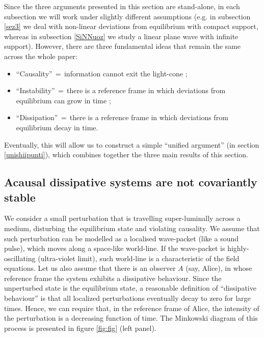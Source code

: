 \documentclass[a4paper, amsfonts, amssymb, amsmath, reprint, showkeys,  twoside, onecolumn,notitlepage,nofootinbib]{revtex4-1}
\theoremstyle{definition}
\theoremstyle{theorem}
\begin{document}
Since the three arguments presented in this section are stand-alone, in each subsection we will work under slightly different assumptions (e.g. in subsection \ref{sez3} we deal with non-linear deviations from equilibrium with compact support, whereas in subsection \ref{SiNNuoz} we study a linear plane wave with infinite support). However, there are three fundamental ideas that remain the same across the whole paper:
\begin{itemize}
\item ``Causality''$\, = \,$information cannot exit the light-cone \cite{Hawking1973,Wald,BemficaCausality2018,Susskind1969,Fox1970};
\item ``Instability''$\, = \,$there is a reference frame in which deviations from equilibrium can grow in time \cite{Hiscock_Insatibility_first_order};
\item ``Dissipation''$\, = \,$there is a reference frame in which deviations from equilibrium decay in time.
\end{itemize}
Eventually, this will allow us to construct a simple ``unified argument'' (in section \ref{unishiipunti}), which combines together the three main results of this section.


\subsection{Acausal dissipative systems are not covariantly stable}\label{thetought}

We consider a small perturbation that is travelling super-luminally across a medium, disturbing the equilibrium state and violating causality. We assume that such perturbation can be modelled as a localised wave-packet (like a sound pulse), which moves along a space-like world-line. If the wave-packet is highly-oscillating (ultra-violet limit), such world-line is a characteristic of the field equations. Let us also assume that there is an observer $A$ (say, Alice), in whose reference frame the system exhibits a dissipative behaviour. Since the unperturbed state is the equilibrium state, a reasonable definition of ``dissipative behaviour'' is that all localized perturbations eventually decay to zero for large times. Hence, we can require that, in the reference frame of Alice, the intensity of the perturbation is a decreasing function of time. The Minkowski diagram of this process is presented in figure \ref{fig:fig} (left panel). 
\end{document}
